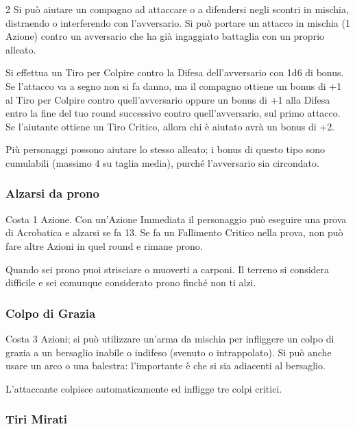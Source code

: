 \begin{multicols}{2}
Si può aiutare un compagno ad attaccare o a difendersi negli scontri in mischia, distraendo o interferendo con l'avversario. Si può portare un attacco in mischia (1 Azione) contro un avversario che ha già ingaggiato battaglia con un proprio alleato.

Si effettua un Tiro per Colpire contro la Difesa dell'avversario con 1d6 di bonus. Se l'attacco va a segno non si fa danno, ma il compagno ottiene un bonus di +1 al Tiro per Colpire contro quell'avversario oppure un bonus di +1 alla Difesa entro la fine del tuo round successivo contro quell'avversario, sul primo attacco. Se l'aiutante ottiene un Tiro Critico, allora chi è aiutato avrà un bonus di +2.

Più personaggi possono aiutare lo stesso alleato; i bonus di questo tipo sono cumulabili (massimo 4 su taglia media), purché l'avversario sia circondato.

\subsubsection{Alzarsi da prono}\label{alzarsidaprono}\hypertarget{alzarsidaprono}{}

Costa 1 Azione. Con un'Azione Immediata il personaggio può eseguire una prova di Acrobatica e alzarsi se fa 13. Se fa un Fallimento Critico nella prova, non può fare altre Azioni in quel round e rimane prono.

Quando sei prono puoi strisciare o muoverti a carponi. Il terreno si considera difficile e sei comunque considerato prono finché non ti alzi.

\subsubsection{Colpo di Grazia} \label{colpodigrazia}

Costa 3 Azioni; si può utilizzare un'arma da mischia per infliggere un colpo di grazia a un bersaglio inabile o indifeso (svenuto o intrappolato). Si può anche usare un arco o una balestra: l'importante è che si sia adiacenti al bersaglio.

L'attaccante colpisce automaticamente ed infligge tre colpi critici.

\subsubsection{Tiri Mirati}\label{tirimirati}


\end{multicols}
